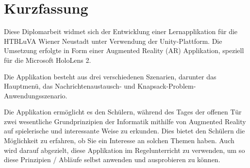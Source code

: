 \chapter{Kurzfassung}
Diese Diplomarbeit widmet sich der Entwicklung einer Lernapplikation für die HTBLuVA Wiener Neustadt unter Verwendung der
Unity-Plattform. Die Umsetzung erfolgte in Form einer Augmented Reality (AR) Applikation, speziell für die Microsoft HoloLens 2.

Die Applikation besteht aus drei verschiedenen Szenarien, darunter das Hauptmenü, das Nachrichtenaustausch- und Knapsack-Problem-Anwendungsszenario.

Die Applikation ermöglicht es den Schülern, während des Tages der offenen Tür zwei wesentliche Grundprinzipien der
Informatik mithilfe von Augmented Reality auf spielerische und interessante Weise zu erkunden. Dies bietet den Schülern
die Möglichkeit zu erfahren, ob Sie ein Interesse an solchen Themen haben. Auch wird darauf abgezielt, diese Applikation
im Regelunterricht zu verwenden, um so diese Prinzipien / Abläufe selbst anwenden und ausprobieren zu können.